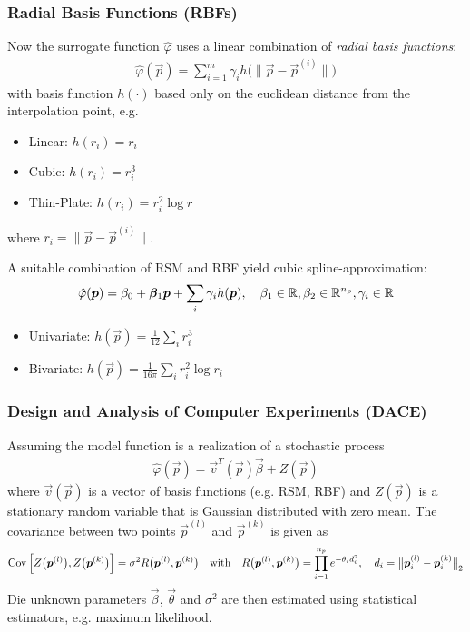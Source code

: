 			\subsubsection{Radial Basis Functions (RBFs)}
				Now the surrogate function \( \hat{\varphi} \) uses a linear combination of \emph{radial basis functions}:
				\begin{align*}
					\hat{\varphi}(\vec{p}) = \sum_{i = 1}^{m} \gamma_i h\Big( \big\lVert \vec{p} - \vec{p}^{(i)} \big\rVert \Big)
				\end{align*}
				with basis function \( h(\cdot) \) based only on the euclidean distance from the interpolation point, e.g.
				\begin{itemize}
					\item Linear: \tabto{2cm} \( h(r_i) = r_i \)
					\item Cubic: \tabto{2cm} \( h(r_i) = r_i^3 \)
					\item Thin-Plate: \tabto{2cm} \( h(r_i) = r_i^2 \log r \)
				\end{itemize}
				where \( r_i = \big\lVert \vec{p} - \vec{p}^{(i)} \big\rVert \).

				A suitable combination of RSM and RBF yield cubic spline-approximation:
				\begin{align*}
					\hat{\varphi}(\bm{p}) = \beta_0 + \bm{\beta}_1 \bm{p} + \sum_i \gamma_i h(\bm{p}),\quad \beta_1 \in \mathbb{R}, \beta_2 \in \mathbb{R}^{n_p}, \gamma_i \in \mathbb{R}
				\end{align*}
				\begin{itemize}
					\item Univariate: \tabto{2cm} \( h(\vec{p}) = \frac{1}{12} \sum_i r_i^3 \)
					\item Bivariate: \tabto{2cm} \( h(\vec{p}) = \frac{1}{16 \pi} \sum_i r_i^2 \log r_i \)
				\end{itemize}

			\subsubsection{Design and Analysis of Computer Experiments (DACE)}
				Assuming the model function is a realization of a stochastic process
				\begin{align*}
					\hat{\varphi}(\vec{p}) = \vec{v}^T(\vec{p}) \vec{\beta} + Z(\vec{p})
				\end{align*}
				where \( \vec{v}(\vec{p}) \) is a vector of basis functions (e.g. RSM, RBF) and \( Z(\vec{p}) \) is a stationary random variable that is Gaussian distributed with zero mean. The covariance between two points \( \vec{p}^{(l)} \) and \( \vec{p}^{(k)} \) is given as
				\begin{align*}
					\operatorname{Cov}\Big[ Z\big(\bm{p}^{(l)}\big), Z\big(\bm{p}^{(k)}\big) \Big] = \sigma^2 R\big(\bm{p}^{(l)}, \bm{p}^{(k)}\big)
					\quad\text{with}\quad
					R\big(\bm{p}^{(l)}, \bm{p}^{(k)}\big) = \prod_{i = 1}^{n_p} e^{-\theta_i d_i^2},\quad d_i = \big\lVert \bm{p}_i^{(l)} - \bm{p}_i^{(k)} \big\rVert_2
				\end{align*}
				Die unknown parameters \(\vec{\beta}\), \(\vec{\theta}\) and \(\sigma^2\) are then estimated using statistical estimators, e.g. maximum likelihood.

